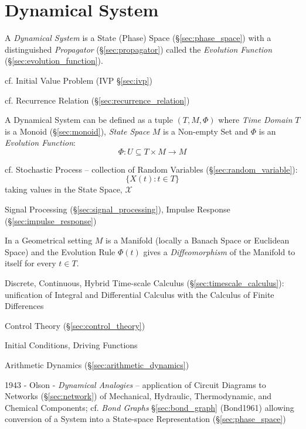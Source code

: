 \section{Dynamical System}\label{sec:dynamical_system}

A \emph{Dynamical System} is a State (Phase) Space (\S\ref{sec:phase_space})
with a distinguished \emph{Propagator} (\S\ref{sec:propagator}) called the
\emph{Evolution Function} (\S\ref{sec:evolution_function}).

\fist cf. Initial Value Problem (IVP \S\ref{sec:ivp})

\fist cf. Recurrence Relation (\S\ref{sec:recurrence_relation})

A Dynamical System can be defined as a tuple $(T,M,\Phi)$ where \emph{Time
  Domain} $T$ is a Monoid (\S\ref{sec:monoid}), \emph{State Space} $M$ is a
Non-empty Set and $\Phi$ is an \emph{Evolution Function}:
\[
  \Phi : U \subseteq T \times M \rightarrow M
\]

\fist cf. Stochastic Process -- collection of Random Variables
(\S\ref{sec:random_variable}):
\[
  \{ X(t) : t \in T \}
\]
taking values in the State Space, $\mathcal{X}$

\fist Signal Processing (\S\ref{sec:signal_processing}), Impulse Response
(\S\ref{sec:impulse_response})

In a Geometrical setting $M$ is a Manifold (locally a Banach Space or Euclidean
Space) and the Evolution Rule $\Phi(t)$ gives a \emph{Diffeomorphism} of the
Manifold to itself for every $t \in T$. %

Discrete, Continuous, Hybrid \fist Time-scale Calculus
(\S\ref{sec:timescale_calculus}): unification of Integral and Differential
Calculus with the Calculus of Finite Differences

Control Theory (\S\ref{sec:control_theory})

Initial Conditions, Driving Functions


Arithmetic Dynamics (\S\ref{sec:arithmetic_dynamics})

1943 - Olson - \emph{Dynamical Analogies} -- application of Circuit Diagrams to
Networks (\S\ref{sec:network}) of Mechanical, Hydraulic, Thermodynamic, and
Chemical Components; cf. \emph{Bond Graphs} \S\ref{sec:bond_graph} (Bond1961)
allowing conversion of a System into a State-space Representation
(\S\ref{sec:phase_space})

